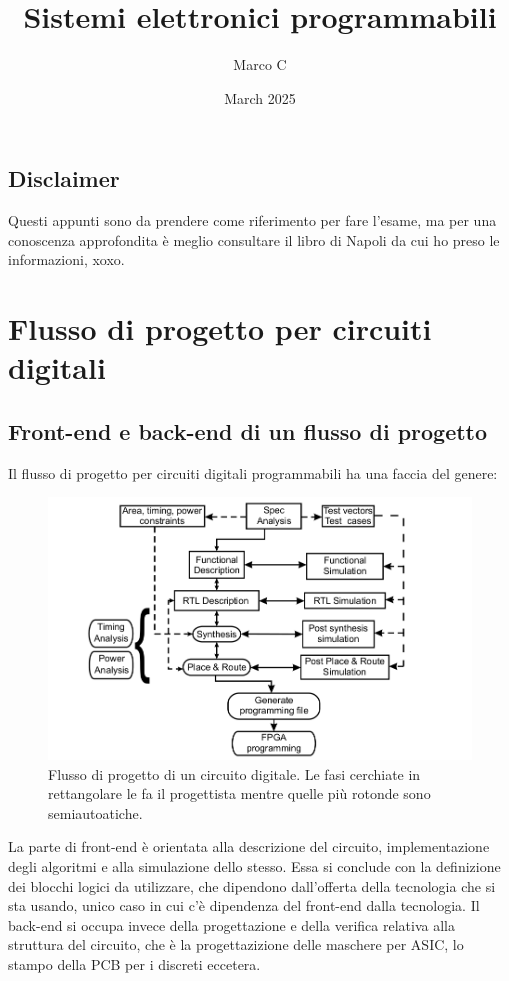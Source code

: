 \documentclass{book}
\title{Sistemi elettronici programmabili}
\author{Marco C}
\date{March 2025}
\begin{document}
\maketitle

\section*{Disclaimer}
    Questi appunti sono da prendere come riferimento per fare l'esame, ma per una conoscenza approfondita è meglio consultare il libro di Napoli da cui ho preso le informazioni, xoxo.
\chapter{Flusso di progetto per circuiti digitali}

\section{Front-end e back-end di un flusso di progetto}
    Il flusso di progetto per circuiti digitali programmabili ha una faccia del genere:
    \begin{figure}[h!]
        \centering
        \includegraphics[width=0.75\linewidth]{img/chapt3img1.png}
        \caption{Flusso di progetto di un circuito digitale. Le fasi cerchiate in rettangolare le fa il progettista mentre quelle più rotonde sono semiautoatiche.}
    \end{figure}
    La parte di front-end è orientata alla descrizione del circuito, implementazione degli algoritmi e alla simulazione dello stesso. Essa si conclude con la definizione dei blocchi logici da utilizzare, che dipendono dall'offerta della tecnologia che si sta usando, unico caso in cui c'è dipendenza del front-end dalla tecnologia. Il back-end si occupa invece della progettazione e della verifica relativa alla struttura del circuito, che è la progettazizione delle maschere per ASIC, lo stampo della PCB per i discreti eccetera.
\end{document}
